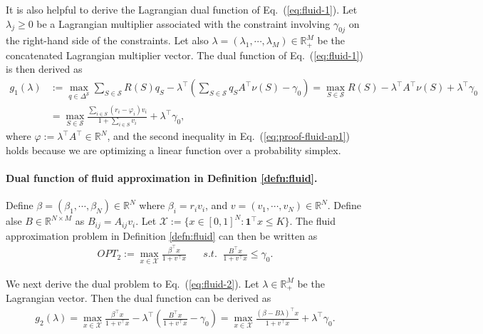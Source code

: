 \documentclass[opre]{informs3aa}
\newcommand{\vct}{\boldsymbol }
\newcommand{\mS}{\mathcal S}
\newcommand{\mX}{\mathcal X}
\begin{document}
\begin{appendices}
{It is also helpful to derive the Lagrangian dual function of Eq.~(\ref{eq:fluid-1}). Let $\lambda_j\geq 0$ be a Lagrangian multiplier associated with the constraint involving $\gamma_{0j}$ on the right-hand side of the constraints. Let also $\lambda = (\lambda_1,\cdots,\lambda_M)\in\mathbb R_+^M$ be the concatenated Lagrangian multiplier vector. The dual function of Eq.~(\ref{eq:fluid-1}) is then derived as
\begin{align}
g_1(\lambda) &:= \max_{q\in\Delta^{\mS}} \sum_{S\in\mS}R(S)q_S - \lambda^\top \left(\sum_{S\in\mS}q_SA^\top\nu(S)-\gamma_0\right)
= \max_{S\in\mS} R(S)-\lambda^\top A^\top \nu(S) + \lambda^\top\gamma_0\label{eq:proof-fluid-ap1}\\
&= \max_{S\in\mS} \frac{\sum_{i\in S}(r_i-\varphi_i)v_i}{1+\sum_{i\in S}v_i} + \lambda^\top\gamma_0,\label{eq:proof-fluid-ap2}
\end{align} 
where $\varphi := \lambda^\top A^\top\in\mathbb R^N$, and the second inequality in Eq.~(\ref{eq:proof-fluid-ap1}) holds because we are optimizing a linear function over a probability simplex.

\paragraph{Dual function of fluid approximation in Definition \ref{defn:fluid}.} Define $\beta=(\beta_1,\cdots,\beta_N)\in\mathbb R^N$ where $\beta_i=r_iv_i$, and $v=(v_1,\cdots,v_N)\in\mathbb R^N$. Define alse $B\in\mathbb R^{N\times M}$ as $B_{ij}=A_{ij}v_i$.
Let $\mathcal X := \{x\in[0,1]^N: \vct 1^\top x\leq K\}$. The fluid approximation problem in Definition \ref{defn:fluid} can then be written as
\begin{align}
OPT_2 := \max_{x\in\mathcal X} \frac{\beta^\top x}{1+v^\top x} \;\;\;\;\;\;s.t.\;\; \frac{B^\top x}{1+v^\top x}\leq\gamma_0.
\label{eq:fluid-2}
\end{align}

We next derive the dual problem to Eq.~(\ref{eq:fluid-2}). Let $\lambda\in\mathbb R_+^M$ be the Lagrangian vector. Then the dual function can be derived as
\begin{align}
g_2(\lambda) = \max_{x\in\mX}\frac{\beta^\top x}{1+v^\top x} - \lambda^\top\left(\frac{B^\top x}{1+v^\top x}-\gamma_0\right) = \max_{x\in\mX}\frac{(\beta- B\lambda)^\top x}{1+v^\top x} + \lambda^\top\gamma_0.
\label{eq:proof-fluid-ap3}
\end{align}

}
\end{appendices}
\end{document}
